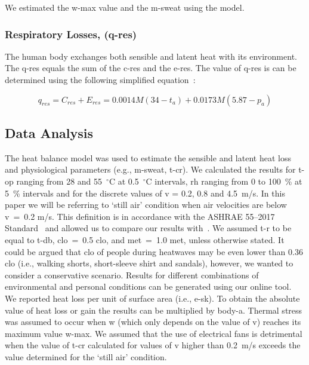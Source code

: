 We estimated the \ac{w-max} value and the \ac{m-sweat} using the  model.

\subsubsection{Respiratory Losses, (\acs{q-res})}
The human body exchanges both sensible and latent heat with its environment.
The \acf{q-res} equals the sum of the \ac{c-res} and the \ac{e-res}.
The value of \ac{q-res} is can be determined using the following simplified equation~\cite{ASHRA2017}:

\begin{equation}
    q_{res} = C_{res} + E_{res} = 0.0014M(34-t_{a}) + 0.0173M(5.87-p_{a})\label{eq:respiratory-losses}
\end{equation}

\subsection{Data Analysis}\label{subsec:data-analysis}

The heat balance model was used to estimate the sensible and latent heat loss and physiological parameters (e.g., \ac{m-sweat}, \ac{t-cr}).
We calculated the results for \ac{t-op} ranging from 28 and 55~$^{\circ}$C at 0.5~$^{\circ}$C intervals, \ac{rh} ranging from 0 to 100~\% at 5~\% intervals and for the discrete values of \ac{v} = 0.2, 0.8 and 4.5~m/s.
In this paper we will be referring to `still air' condition when air velocities are below \ac{v}~=~0.2 m/s.
This definition is in accordance with the ASHRAE 55--2017 Standard~\cite{ashrae552017} and allowed us to compare our results with~.
We assumed \ac{t-r} to be equal to \ac{t-db}, \ac{clo}~=~0.5 clo, and \ac{met}~=~1.0 met, unless otherwise stated.
It could be argued that \ac{clo} of people during heatwaves may be even lower than 0.36 clo (i.e., walking shorts, short-sleeve shirt and sandals), however, we wanted to consider a conservative scenario.
Results for different combinations of environmental and personal conditions can be generated using our online tool.
We reported heat loss per unit of surface area (i.e., \ac{e-sk}).
To obtain the absolute value of heat loss or gain the results can be multiplied by \ac{body-a}.
Thermal stress was assumed to occur when \ac{w} (which only depends on the value of \ac{v}) reaches its maximum value \ac{w-max}.
We assumed that the use of electrical fans is detrimental when the value of \ac{t-cr} calculated for values of \ac{v} higher than 0.2~m/s exceeds the value determined for the `still air' condition.


